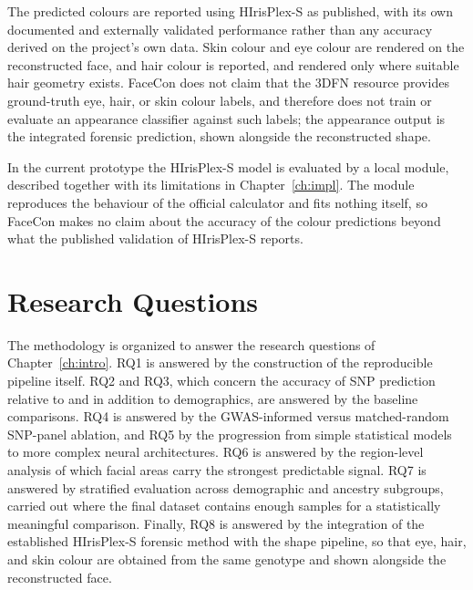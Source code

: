 The predicted colours are reported using HIrisPlex-S as published, with its own documented and externally validated performance rather than any accuracy derived on the project's own data. Skin colour and eye colour are rendered on the reconstructed face, and hair colour is reported, and rendered only where suitable hair geometry exists. FaceCon does not claim that the 3DFN resource provides ground-truth eye, hair, or skin colour labels, and therefore does not train or evaluate an appearance classifier against such labels; the appearance output is the integrated forensic prediction, shown alongside the reconstructed shape.

In the current prototype the HIrisPlex-S model is evaluated by a local module, described together with its limitations in Chapter~\ref{ch:impl}. The module reproduces the behaviour of the official calculator and fits nothing itself, so FaceCon makes no claim about the accuracy of the colour predictions beyond what the published validation of HIrisPlex-S reports.

\section{Research Questions}
The methodology is organized to answer the research questions of Chapter~\ref{ch:intro}. RQ1 is answered by the construction of the reproducible pipeline itself. RQ2 and RQ3, which concern the accuracy of SNP prediction relative to and in addition to demographics, are answered by the baseline comparisons. RQ4 is answered by the GWAS-informed versus matched-random SNP-panel ablation, and RQ5 by the progression from simple statistical models to more complex neural architectures. RQ6 is answered by the region-level analysis of which facial areas carry the strongest predictable signal. RQ7 is answered by stratified evaluation across demographic and ancestry subgroups, carried out where the final dataset contains enough samples for a statistically meaningful comparison. Finally, RQ8 is answered by the integration of the established HIrisPlex-S forensic method with the shape pipeline, so that eye, hair, and skin colour are obtained from the same genotype and shown alongside the reconstructed face.

